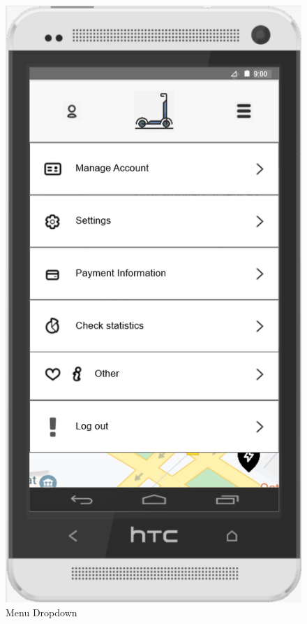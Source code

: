 \documentclass[a4paper, 12pt]{article}
\begin{document}
\begin{figure} [htbp]
  \begin{center}
    \includegraphics[scale=0.75]{images/prototypes/02-menu-dropdown.png}
  \end{center}
  \caption{Menu Dropdown}
\end{figure}
\end{document}
